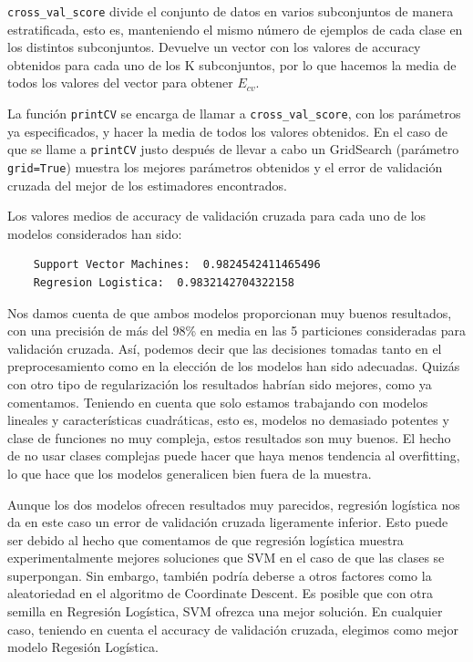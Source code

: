 \documentclass[a4]{article}
\begin{document}
\lstinline|cross_val_score| divide el conjunto de datos en varios subconjuntos de manera estratificada, esto es, manteniendo el mismo número de ejemplos de cada clase en los distintos subconjuntos. Devuelve un vector con los valores de accuracy obtenidos para cada uno de los K subconjuntos, por lo que hacemos la media de todos los valores del vector para obtener $E_{cv}$. 

La función \lstinline|printCV| se encarga de llamar a \lstinline|cross_val_score|, con los parámetros ya especificados, y hacer la media de todos los valores obtenidos. En el caso de que se llame a \lstinline|printCV| justo después de llevar a cabo un GridSearch (parámetro \lstinline|grid=True|) muestra los mejores parámetros obtenidos y el error de validación cruzada del mejor de los estimadores encontrados.

Los valores medios de accuracy de validación cruzada para cada uno de los modelos considerados han sido: 

\begin{lstlisting}
	Support Vector Machines:  0.9824542411465496
	Regresion Logistica:  0.9832142704322158
\end{lstlisting} 

Nos damos cuenta de que ambos modelos proporcionan muy buenos resultados, con una precisión de más del 98\% en media en las 5 particiones consideradas para validación cruzada. Así, podemos decir que las decisiones tomadas tanto en el preprocesamiento como en la elección de los modelos han sido adecuadas. Quizás con otro tipo de regularización los resultados habrían sido mejores, como ya comentamos. Teniendo en cuenta que solo estamos trabajando con modelos lineales y características cuadráticas, esto es, modelos no demasiado potentes y clase de funciones no muy compleja, estos resultados son muy buenos. El hecho de no usar clases complejas puede hacer que haya menos tendencia al overfitting, lo que hace que los modelos generalicen bien fuera de la muestra. 

Aunque los dos modelos ofrecen resultados muy parecidos, regresión logística nos da en este caso un error de validación cruzada ligeramente inferior. Esto puede ser debido al hecho que comentamos de que regresión logística muestra experimentalmente mejores soluciones que SVM en el caso de que las clases se superpongan. Sin embargo, también podría deberse a otros factores como la aleatoriedad en el algoritmo de Coordinate Descent. Es posible que con otra semilla en Regresión Logística, SVM ofrezca una mejor solución. En cualquier caso, teniendo en cuenta el accuracy de validación cruzada, elegimos como mejor modelo Regesión Logística. 
\end{document}
